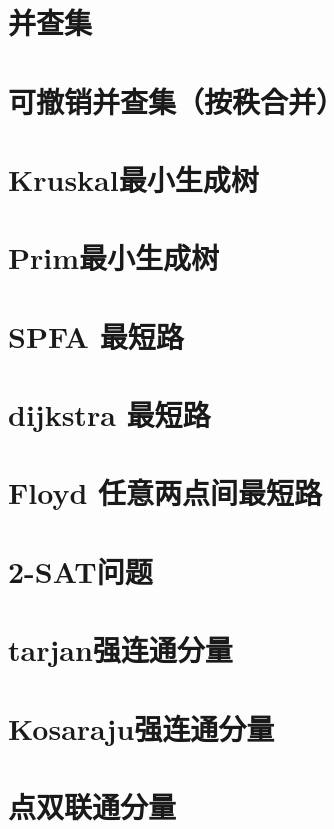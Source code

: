 \section{并查集}
\raggedbottom
\hrulefill
\section{可撤销并查集（按秩合并）}
\raggedbottom
\hrulefill
\section{Kruskal最小生成树}
\raggedbottom
\hrulefill
\section{Prim最小生成树}
\raggedbottom
\hrulefill
\section{SPFA 最短路}
\raggedbottom
\hrulefill
\section{dijkstra 最短路}
\raggedbottom
\hrulefill
\section{Floyd 任意两点间最短路}
\raggedbottom
\hrulefill
\section{2-SAT问题}
\raggedbottom
\hrulefill
\section{tarjan强连通分量}
\raggedbottom
\hrulefill
\section{Kosaraju强连通分量}
\raggedbottom
\hrulefill
\section{点双联通分量}
\raggedbottom
\hrulefill

